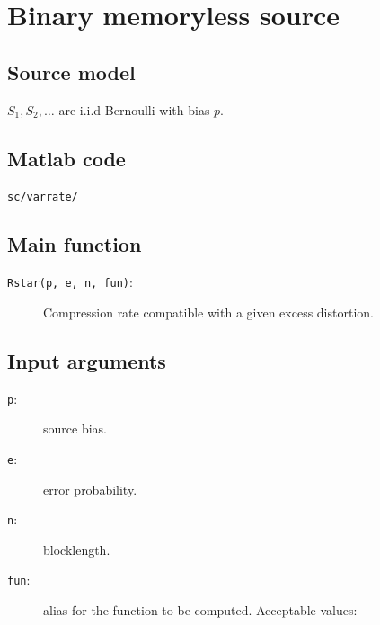 \documentclass[a4paper,11p]{memoir}
\begin{document}
\section{Binary memoryless source}
\subsection{Source model}
$ S_1, S_2, \ldots $ are i.i.d Bernoulli with bias $p$. 


\subsection{Matlab code}
 \verb|sc/varrate/|
 
 
 
 
 \subsection{Main function}
\begin{description}
\item[\texttt{Rstar(p, e, n, fun)}:]  Compression rate compatible with a given excess distortion. 
\end{description}

\subsection{Input arguments}

\begin{description}
\item[\texttt{p}:] source bias.
\item[\texttt{e}:] error probability.
\item[\texttt{n}:] blocklength.
\item[\texttt{fun}:] alias for the function to be computed. Acceptable values:

\end{description}
\end{document}
